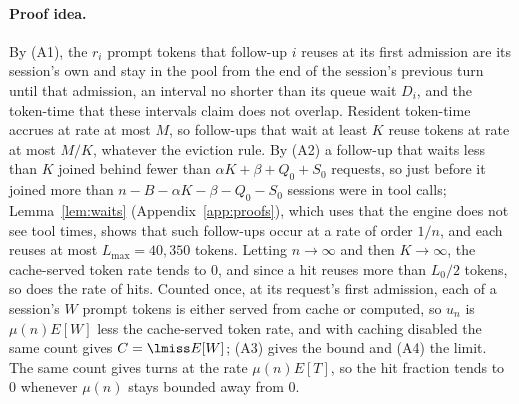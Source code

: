 \paragraph{Proof idea.} By (A1), the $r_i$ prompt tokens that follow-up $i$ reuses at its first admission are its session's own and stay in the pool from the end of the session's previous turn until that admission, an interval no shorter than its queue wait $D_i$, and the token-time that these intervals claim does not overlap. Resident token-time accrues at rate at most $M$, so follow-ups that wait at least $K$ reuse tokens at rate at most $M/K$, whatever the eviction rule. By (A2) a follow-up that waits less than $K$ joined behind fewer than $\alpha K+\beta+Q_0+S_0$ requests, so just before it joined more than $n-B-\alpha K-\beta-Q_0-S_0$ sessions were in tool calls; Lemma~\ref{lem:waits} (Appendix~\ref{app:proofs}), which uses that the engine does not see tool times, shows that such follow-ups occur at a rate of order $1/n$, and each reuses at most $L_{\max}=40{,}350$ tokens. Letting $n\to\infty$ and then $K\to\infty$, the cache-served token rate tends to 0, and since a hit reuses more than $L_0/2$ tokens, so does the rate of hits. Counted once, at its request's first admission, each of a session's $W$ prompt tokens is either served from cache or computed, so $u_n$ is $\mu(n)E[W]$ less the cache-served token rate, and with caching disabled the same count gives $C=\lmiss E[W]$; (A3) gives the bound and (A4) the limit. The same count gives turns at the rate $\mu(n)E[T]$, so the hit fraction tends to 0 whenever $\mu(n)$ stays bounded away from 0.


